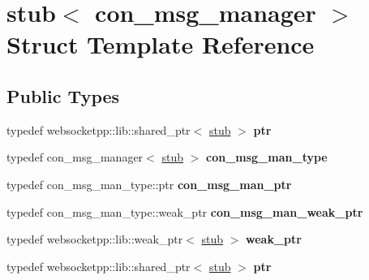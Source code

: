 \hypertarget{structstub}{}\section{stub$<$ con\+\_\+msg\+\_\+manager $>$ Struct Template Reference}
\label{structstub}
\subsection*{Public Types}
\begin{DoxyCompactItemize}
\item 
typedef websocketpp\+::lib\+::shared\+\_\+ptr$<$ \hyperlink{structstub}{stub} $>$ {\bfseries ptr}\hypertarget{structstub_a0d35742a05f812194c64f1d51d53d116}{}\label{structstub_a0d35742a05f812194c64f1d51d53d116}

\item 
typedef con\+\_\+msg\+\_\+manager$<$ \hyperlink{structstub}{stub} $>$ {\bfseries con\+\_\+msg\+\_\+man\+\_\+type}\hypertarget{structstub_a871872eb48631cc26c0ccfa874fbb069}{}\label{structstub_a871872eb48631cc26c0ccfa874fbb069}

\item 
typedef con\+\_\+msg\+\_\+man\+\_\+type\+::ptr {\bfseries con\+\_\+msg\+\_\+man\+\_\+ptr}\hypertarget{structstub_a8060330f1080540d2e35d48e038c1314}{}\label{structstub_a8060330f1080540d2e35d48e038c1314}

\item 
typedef con\+\_\+msg\+\_\+man\+\_\+type\+::weak\+\_\+ptr {\bfseries con\+\_\+msg\+\_\+man\+\_\+weak\+\_\+ptr}\hypertarget{structstub_a0ff78a234640782ab4b10b0e1335b075}{}\label{structstub_a0ff78a234640782ab4b10b0e1335b075}

\item 
typedef websocketpp\+::lib\+::weak\+\_\+ptr$<$ \hyperlink{structstub}{stub} $>$ {\bfseries weak\+\_\+ptr}\hypertarget{structstub_ac65faf380006155d470fbfe954772c92}{}\label{structstub_ac65faf380006155d470fbfe954772c92}

\item 
typedef websocketpp\+::lib\+::shared\+\_\+ptr$<$ \hyperlink{structstub}{stub} $>$ {\bfseries ptr}\hypertarget{structstub_a0d35742a05f812194c64f1d51d53d116}{}\label{structstub_a0d35742a05f812194c64f1d51d53d116}

\end{DoxyCompactItemize}

